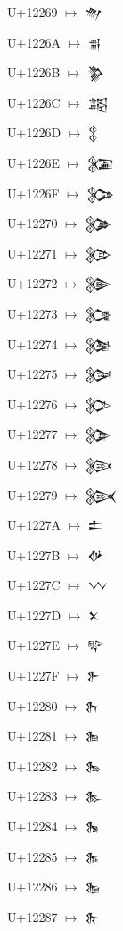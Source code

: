{\noindent U+12269  $\mapsto$ {\cufont 𒉩}\par
\noindent U+1226A  $\mapsto$ {\cufont 𒉪}\par
\noindent U+1226B  $\mapsto$ {\cufont 𒉫}\par
\noindent U+1226C  $\mapsto$ {\cufont 𒉬}\par
\noindent U+1226D  $\mapsto$ {\cufont 𒉭}\par
\noindent U+1226E  $\mapsto$ {\cufont 𒉮}\par
\noindent U+1226F  $\mapsto$ {\cufont 𒉯}\par
\noindent U+12270  $\mapsto$ {\cufont 𒉰}\par
\noindent U+12271  $\mapsto$ {\cufont 𒉱}\par
\noindent U+12272  $\mapsto$ {\cufont 𒉲}\par
\noindent U+12273  $\mapsto$ {\cufont 𒉳}\par
\noindent U+12274  $\mapsto$ {\cufont 𒉴}\par
\noindent U+12275  $\mapsto$ {\cufont 𒉵}\par
\noindent U+12276  $\mapsto$ {\cufont 𒉶}\par
\noindent U+12277  $\mapsto$ {\cufont 𒉷}\par
\noindent U+12278  $\mapsto$ {\cufont 𒉸}\par
\noindent U+12279  $\mapsto$ {\cufont 𒉹}\par
\noindent U+1227A  $\mapsto$ {\cufont 𒉺}\par
\noindent U+1227B  $\mapsto$ {\cufont 𒉻}\par
\noindent U+1227C  $\mapsto$ {\cufont 𒉼}\par
\noindent U+1227D  $\mapsto$ {\cufont 𒉽}\par
\noindent U+1227E  $\mapsto$ {\cufont 𒉾}\par
\noindent U+1227F  $\mapsto$ {\cufont 𒉿}\par
\noindent U+12280  $\mapsto$ {\cufont 𒊀}\par
\noindent U+12281  $\mapsto$ {\cufont 𒊁}\par
\noindent U+12282  $\mapsto$ {\cufont 𒊂}\par
\noindent U+12283  $\mapsto$ {\cufont 𒊃}\par
\noindent U+12284  $\mapsto$ {\cufont 𒊄}\par
\noindent U+12285  $\mapsto$ {\cufont 𒊅}\par
\noindent U+12286  $\mapsto$ {\cufont 𒊆}\par
\noindent U+12287  $\mapsto$ {\cufont 𒊇}\par
}
